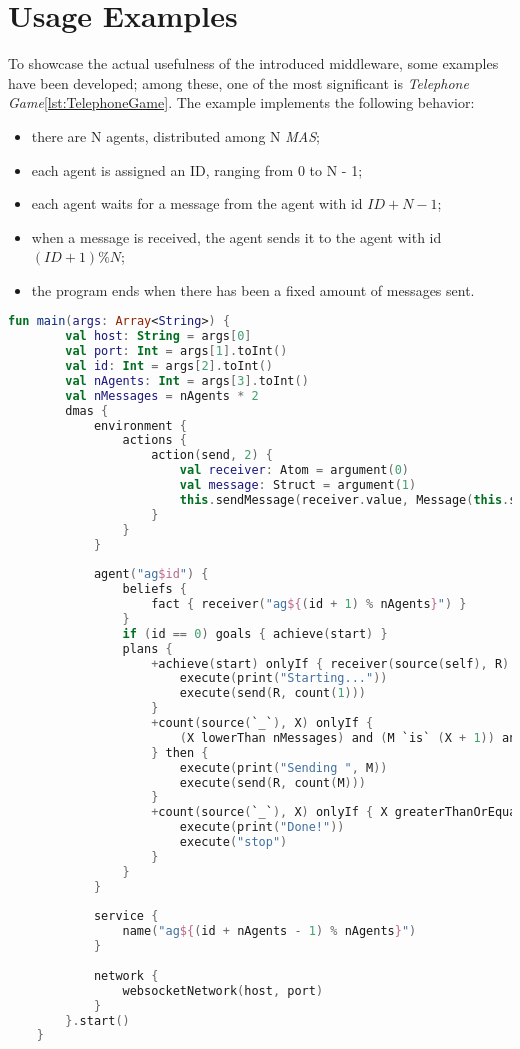 \section{Usage Examples}

To showcase the actual usefulness of the introduced middleware, some examples have been developed; among these, one of the most significant is \textit{Telephone Game}\ref{lst:TelephoneGame}. The example implements the following behavior:

\begin{itemize}
    \item there are N agents, distributed among N \textit{MAS};
    \item each agent is assigned an ID, ranging from 0 to N - 1;
    \item each agent waits for a message from the agent with id \(ID + N - 1\);
    \item when a message is received, the agent sends it to the agent with id \((ID + 1) \% N\);
    \item the program ends when there has been a fixed amount of messages sent.
\end{itemize}

\begin{lstlisting}[caption={Usage example: \texttt{TelephoneGame}.}, label={lst:TelephoneGame}, language=Kotlin]
    fun main(args: Array<String>) {
        val host: String = args[0]
        val port: Int = args[1].toInt()
        val id: Int = args[2].toInt()
        val nAgents: Int = args[3].toInt()
        val nMessages = nAgents * 2
        dmas {
            environment {
                actions {
                    action(send, 2) {
                        val receiver: Atom = argument(0)
                        val message: Struct = argument(1)
                        this.sendMessage(receiver.value, Message(this.sender, Tell, message))
                    }
                }
            }
    
            agent("ag$id") {
                beliefs {
                    fact { receiver("ag${(id + 1) % nAgents}") }
                }
                if (id == 0) goals { achieve(start) }
                plans {
                    +achieve(start) onlyIf { receiver(source(self), R) } then {
                        execute(print("Starting..."))
                        execute(send(R, count(1)))
                    }
                    +count(source(`_`), X) onlyIf {
                        (X lowerThan nMessages) and (M `is` (X + 1)) and receiver(source(self), R)
                    } then {
                        execute(print("Sending ", M))
                        execute(send(R, count(M)))
                    }
                    +count(source(`_`), X) onlyIf { X greaterThanOrEqualsTo nMessages } then {
                        execute(print("Done!"))
                        execute("stop")
                    }
                }
            }
    
            service {
                name("ag${(id + nAgents - 1) % nAgents}")
            }
    
            network {
                websocketNetwork(host, port)
            }
        }.start()
    }
\end{lstlisting}

